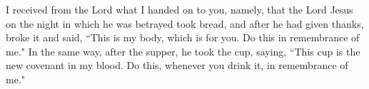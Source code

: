 \lettrine[lines=3,loversize=0.15]{I}{} received from the Lord what I handed on to you, namely, that the Lord Jesus on the night in which he was betrayed took bread, and after he had given thanks, broke it and said, ``This is my body, which is for you. Do this in remembrance of me." In the same way, after the supper, he took the cup, saying, ``This cup is the new covenant in my blood. Do this, whenever you drink it, in remembrance of me."
